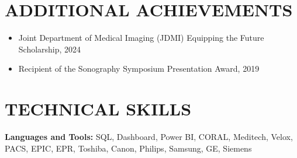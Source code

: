 \documentclass[letterpaper,11pt]{article}
\newcommand{\resumeItem}[1]{
  \item\small{
    {#1 \vspace{-1pt}}
  }
}
\newcommand{\resumeItemListStart}{\begin{itemize}[leftmargin=0.1in]}
\newcommand{\resumeItemListEnd}{\end{itemize}\vspace{-5pt}}
\begin{document}
\section{\color{airforceblue}ADDITIONAL ACHIEVEMENTS}    
    \resumeItemListStart
        \vspace{0.5pt}
        \resumeItem{\normalsize{Joint Department of Medical Imaging (JDMI) Equipping the Future Scholarship, 2024}}
        \vspace{-5pt}
        \resumeItem{\normalsize{Recipient of the Sonography Symposium Presentation Award, 2019}}
        \vspace{-5pt}
        

        
    \resumeItemListEnd  
   
%

\section{\color{airforceblue} TECHNICAL SKILLS}
 \begin{itemize}[leftmargin=0in, label={}]
    \small{\item{
     \textbf{\normalsize{Languages and Tools:}}{ \normalsize{SQL, Dashboard, Power BI, CORAL, Meditech, Velox, PACS, EPIC, EPR, Toshiba, Canon, Philips, Samsung, GE, Siemens}} \\
      \vspace{1.2pt}
      
      

     }}
 \end{itemize}
 \vspace{-16pt}
\end{document}
